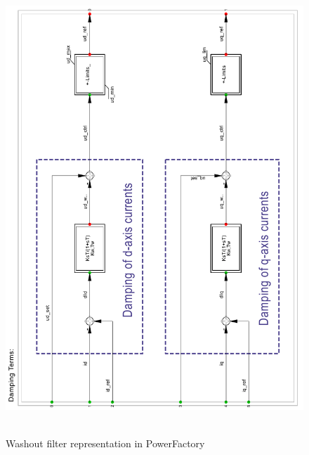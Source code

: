 \begin{figure}[H]
\centering
    \includegraphics[height = 17cm,width =15cm]{Diagrams/Appendix_A/Damping_terms_PFD.pdf}
    \caption{Washout filter representation in PowerFactory \cite{erlich_description_nodate}}
    \label{fig:Damping_terms_PFD}
\end{figure}